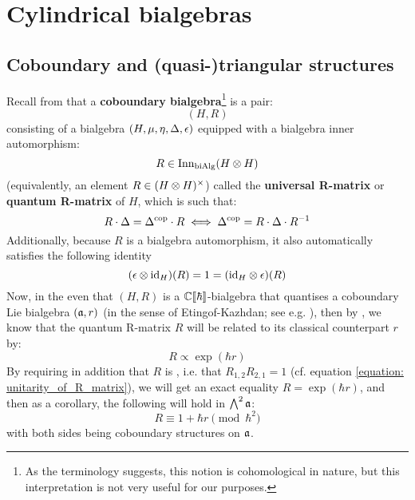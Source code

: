 \section{Cylindrical bialgebras}
    \subsection{Coboundary and (quasi-)triangular structures}
        Recall from \cite[Subsection 9.4.1]{etingof_schiffmann_lectures_on_quantum_groups} that a \textbf{coboundary bialgebra}\footnote{As the terminology suggests, this notion is cohomological in nature, but this interpretation is not very useful for our purposes.} is a pair:
            $$(H, R)$$
        consisting of a bialgebra $(H, \mu, \eta, \Delta, \epsilon)$ equipped with a bialgebra inner automorphism:
            $$R \in \Inn_{\bi\Alg}(H \tensor H)$$
        (equivalently, an element $R \in (H \tensor H)^{\x}$) called the \textbf{universal R-matrix} or \textbf{quantum R-matrix} of $H$, which is such that:
            \begin{equation} \label{equation: R_matrix_intertwining_with_coproduct}
                R \cdot \Delta = \Delta^{\mathrm{cop}} \cdot R \iff \Delta^{\mathrm{cop}} = R \cdot \Delta \cdot R^{-1}
            \end{equation}
        Additionally, because $R$ is a bialgebra automorphism, it also automatically satisfies the following identity
            \begin{equation} \label{equation: R_matrix_intertwining_with_counit}
                (\e \tensor \id_H)(R) = 1 = (\id_H \tensor \e)(R)
            \end{equation}
        Now, in the even that $(H, R)$ is a $\mathbb{C}[\![\hbar]\!]$-bialgebra that quantises a coboundary Lie bialgebra $(\mathfrak{a}, r)$ (in the sense of Etingof-Kazhdan; see e.g. \cite{etingof_kazhdan_quantisation_1}), then by \cite[Proposition 9.2]{etingof_schiffmann_lectures_on_quantum_groups}, we know that the quantum R-matrix $R$ will be related to its classical counterpart $r$ by:
            $$R \propto \exp( \hbar r )$$
        By requiring in addition that $R$ is , i.e. that $R_{1, 2} R_{2, 1} = 1$ (cf. equation \eqref{equation: unitarity_of_R_matrix}), we will get an exact equality $R = \exp(\hbar r)$, and then as a corollary, the following will hold in $\bigwedge^2 \mathfrak{a}$:
            $$R \equiv 1 + \hbar r \pmod{\hbar^2}$$
        with both sides being coboundary structures on $\mathfrak{a}$.

